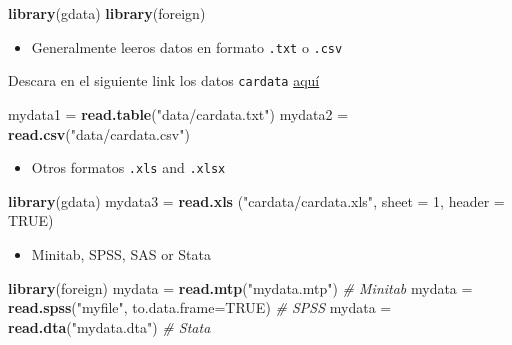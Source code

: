 \documentclass[]{book}
\newenvironment{Shaded}{\begin{snugshade}}{\end{snugshade}}
\newcommand{\KeywordTok}[1]{\textcolor[rgb]{0.13,0.29,0.53}{\textbf{#1}}}
\newcommand{\DataTypeTok}[1]{\textcolor[rgb]{0.13,0.29,0.53}{#1}}
\newcommand{\DecValTok}[1]{\textcolor[rgb]{0.00,0.00,0.81}{#1}}
\newcommand{\StringTok}[1]{\textcolor[rgb]{0.31,0.60,0.02}{#1}}
\newcommand{\CommentTok}[1]{\textcolor[rgb]{0.56,0.35,0.01}{\textit{#1}}}
\newcommand{\OtherTok}[1]{\textcolor[rgb]{0.56,0.35,0.01}{#1}}
\newcommand{\NormalTok}[1]{#1}
\providecommand{\tightlist}{%
  \setlength{\itemsep}{0pt}\setlength{\parskip}{0pt}}
\begin{document}
\begin{Shaded}
\begin{Highlighting}[]
\KeywordTok{library}\NormalTok{(gdata)}
\KeywordTok{library}\NormalTok{(foreign)}
\end{Highlighting}
\end{Shaded}

\bigskip

\begin{itemize}
\tightlist
\item
  Generalmente leeros datos en formato \texttt{.txt} o \texttt{.csv}
\end{itemize}

Descara en el siguiente link los datos \texttt{cardata}
\href{data/cardata.zip}{aquí}

\begin{Shaded}
\begin{Highlighting}[]
\NormalTok{mydata1 =}\StringTok{ }\KeywordTok{read.table}\NormalTok{(}\StringTok{"data/cardata.txt"}\NormalTok{) }
\NormalTok{mydata2 =}\StringTok{ }\KeywordTok{read.csv}\NormalTok{(}\StringTok{"data/cardata.csv"}\NormalTok{)  }
\end{Highlighting}
\end{Shaded}

\begin{itemize}
\tightlist
\item
  Otros formatos \texttt{.xls} and \texttt{.xlsx}
\end{itemize}

\begin{Shaded}
\begin{Highlighting}[]
\KeywordTok{library}\NormalTok{(gdata)}
\NormalTok{mydata3 =}\StringTok{ }\KeywordTok{read.xls}\NormalTok{ (}\StringTok{"cardata/cardata.xls"}\NormalTok{, }\DataTypeTok{sheet =} \DecValTok{1}\NormalTok{, }\DataTypeTok{header =} \OtherTok{TRUE}\NormalTok{)}
\end{Highlighting}
\end{Shaded}

\begin{itemize}
\tightlist
\item
  Minitab, SPSS, SAS or Stata
\end{itemize}

\begin{Shaded}
\begin{Highlighting}[]
\KeywordTok{library}\NormalTok{(foreign)                   }
\NormalTok{mydata =}\StringTok{ }\KeywordTok{read.mtp}\NormalTok{(}\StringTok{"mydata.mtp"}\NormalTok{)  }\CommentTok{# Minitab}
\NormalTok{mydata =}\StringTok{ }\KeywordTok{read.spss}\NormalTok{(}\StringTok{"myfile"}\NormalTok{, }\DataTypeTok{to.data.frame=}\OtherTok{TRUE}\NormalTok{) }\CommentTok{# SPSS}
\NormalTok{mydata =}\StringTok{ }\KeywordTok{read.dta}\NormalTok{(}\StringTok{"mydata.dta"}\NormalTok{) }\CommentTok{# Stata}
\end{Highlighting}
\end{Shaded}
\end{document}
